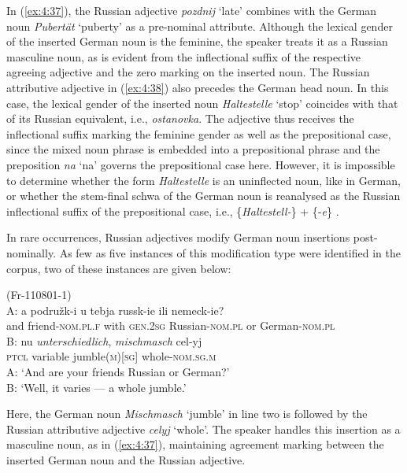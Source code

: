 \noindent In (\ref{ex:4:37}), the Russian adjective \textit{pozdnij} `late' combines with the German noun \textit{Pubertät} `puberty' as a pre-nominal attribute. Although the lexical gender of the inserted German noun is the feminine, the speaker treats it as a Russian masculine noun, as is evident from the inflectional suffix of the respective agreeing adjective and the zero marking on the inserted noun. The Russian attributive adjective in (\ref{ex:4:38}) also precedes the German head noun. In this case, the lexical gender of the inserted noun \textit{Haltestelle} `stop' coincides with that of its Russian equivalent, i.e., \textit{ostanovka}. The adjective thus receives the inflectional suffix marking the feminine gender as well as the prepositional case, since the mixed noun phrase is embedded into a prepositional phrase and the preposition \textit{na} `na' governs the prepositional case here. However, it is impossible to determine whether the form \textit{Haltestelle} is an uninflected noun, like in German, or whether the stem-final schwa of the German noun is reanalysed as the Russian inflectional suffix of the prepositional case, i.e., \{\textit{Haltestell-}\} + \{{-\textit{e}}\} \citep[cf.][276]{zdan-trubc-01}.

In rare occurrences, Russian adjectives  modify German noun insertions post-nominally. As few as five instances of this modification type were identified in the corpus, two of these instances are given below:

\ea
\label{ex4.41}
(Fr-110801-1)\\
\gll A: a podružk-i u tebja russk-ie ili   nemeck-ie?\\
	{} and friend-\textsc{nom.pl.f} with \textsc{gen.2sg} Russian-\textsc{nom.pl} or  German-\textsc{nom.pl}\\
\glt
\gll B: nu \textit{unterschiedlich}, \textit{mischmasch} cel-yj\\
	{} \textsc{ptcl} variable jumble(\textsc{m})[\textsc{sg}] whole-\textsc{nom.sg.m}\\
\glt
A: `And are your friends Russian or German?'\\
B: `Well, it varies --- a whole jumble.'\\
\z

\noindent Here, the German noun \textit{Mischmasch} `jumble' in line two is followed by the Russian attributive adjective \textit{celyj} `whole'. The speaker handles this insertion as a masculine noun, as in (\ref{ex:4:37}), maintaining agreement marking between the inserted German noun and the Russian adjective.

